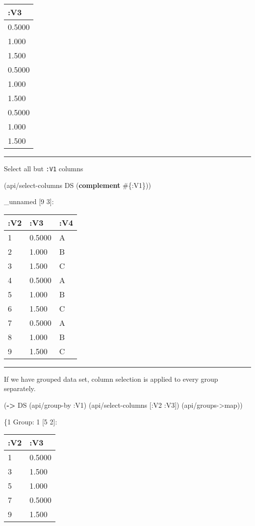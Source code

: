 \documentclass[]{article}
\newenvironment{Shaded}{\begin{snugshade}}{\end{snugshade}}
\newcommand{\KeywordTok}[1]{\textcolor[rgb]{0.13,0.29,0.53}{\textbf{#1}}}
\newcommand{\AttributeTok}[1]{\textcolor[rgb]{0.77,0.63,0.00}{#1}}
\newcommand{\NormalTok}[1]{#1}
\begin{document}
\begin{longtable}[]{@{}l@{}}
\toprule
:V3\tabularnewline
\midrule
\endhead
0.5000\tabularnewline
1.000\tabularnewline
1.500\tabularnewline
0.5000\tabularnewline
1.000\tabularnewline
1.500\tabularnewline
0.5000\tabularnewline
1.000\tabularnewline
1.500\tabularnewline
\bottomrule
\end{longtable}

\begin{center}\rule{0.5\linewidth}{0.5pt}\end{center}

Select all but \texttt{:V1} columns

\begin{Shaded}
\begin{Highlighting}[]
\NormalTok{(api/select-columns DS (}\KeywordTok{complement}\NormalTok{ #\{}\AttributeTok{:V1}\NormalTok{\}))}
\end{Highlighting}
\end{Shaded}

\_unnamed {[}9 3{]}:

\begin{longtable}[]{@{}lll@{}}
\toprule
:V2 & :V3 & :V4\tabularnewline
\midrule
\endhead
1 & 0.5000 & A\tabularnewline
2 & 1.000 & B\tabularnewline
3 & 1.500 & C\tabularnewline
4 & 0.5000 & A\tabularnewline
5 & 1.000 & B\tabularnewline
6 & 1.500 & C\tabularnewline
7 & 0.5000 & A\tabularnewline
8 & 1.000 & B\tabularnewline
9 & 1.500 & C\tabularnewline
\bottomrule
\end{longtable}

\begin{center}\rule{0.5\linewidth}{0.5pt}\end{center}

If we have grouped data set, column selection is applied to every group
separately.

\begin{Shaded}
\begin{Highlighting}[]
\NormalTok{(}\KeywordTok{->}\NormalTok{ DS}
\NormalTok{    (api/group-by }\AttributeTok{:V1}\NormalTok{)}
\NormalTok{    (api/select-columns [}\AttributeTok{:V2} \AttributeTok{:V3}\NormalTok{])}
\NormalTok{    (api/groups->map))}
\end{Highlighting}
\end{Shaded}

\{1 Group: 1 {[}5 2{]}:

\begin{longtable}[]{@{}ll@{}}
\toprule
:V2 & :V3\tabularnewline
\midrule
\endhead
1 & 0.5000\tabularnewline
3 & 1.500\tabularnewline
5 & 1.000\tabularnewline
7 & 0.5000\tabularnewline
9 & 1.500\tabularnewline
\bottomrule
\end{longtable}
\end{document}
